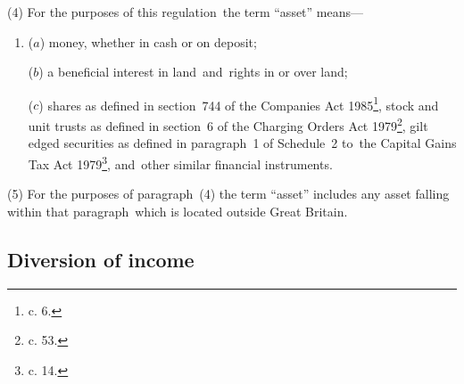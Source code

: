 \documentclass[12pt,a4paper]{article}
\begin{document}


(4) For the purposes of this regulation~the term “asset” means—
\begin{enumerate}\item[]
($a$) money, whether in cash or on deposit;

($b$) a beneficial interest in land~and~rights in or over land;

($c$) shares as defined in section~744 of the Companies Act 1985\footnote{ c. 6.}, stock and
unit trusts as defined in section~6 of the Charging Orders Act 1979\footnote{ c. 53.}, gilt
edged securities as defined in paragraph~1 of Schedule~2 to~the Capital Gains
Tax Act 1979\footnote{ c. 14.}, and~other similar financial instruments.
\end{enumerate}

(5) For the purposes of paragraph~(4) the term “asset” includes any asset
falling within that paragraph~which is located outside Great Britain.


\subsection[24. Diversion of income]{Diversion of income}

%
\end{document}
